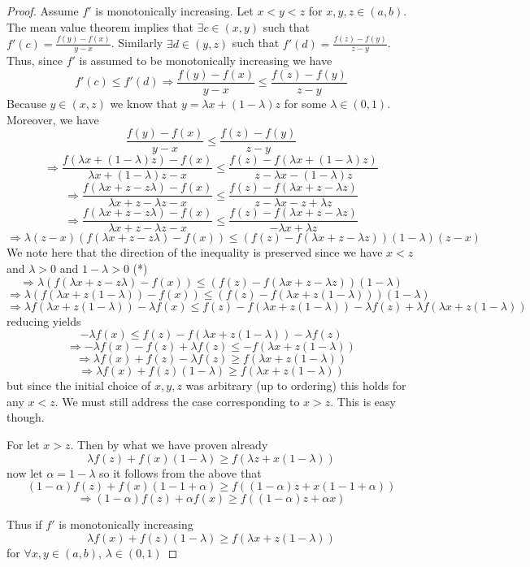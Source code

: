 \documentclass[12pt]{article}
\begin{document}
\begin{proof}Assume $f'$ is monotonically increasing. Let $x < y<z$ for $x,y,z \in (a,b)$. The mean value theorem implies that $\exists c \in (x,y)$ such that $f'(c)=\frac{f(y)-f(x)}{y-x}$. Similarly $\exists d \in (y,z)$ such that $f'(d)=\frac{f(z)-f(y)}{z-y}$. Thus, since $f'$ is assumed to be monotonically increasing we have 
\[f'(c) \leq f'(d) \Rightarrow \frac{f(y)-f(x)}{y-x} \leq \frac{f(z)-f(y)}{z-y}\]
Because $y\in(x,z)$ we know that $y=\lambda x+ (1-\lambda)z$ for some $\lambda \in (0,1)$. Moreover, we have
\[\frac{f(y)-f(x)}{y-x} \leq \frac{f(z)-f(y)}{z-y}\]
\[\Rightarrow \frac{f(\lambda x+ (1-\lambda)z)-f(x)}{\lambda x+ (1-\lambda)z-x} \leq \frac{f(z)-f(\lambda x+ (1-\lambda)z)}{z-\lambda x- (1-\lambda)z}\]
\[\Rightarrow \frac{f(\lambda x+ z - z \lambda)-f(x)}{\lambda x+ z-\lambda z-x} \leq \frac{f(z)-f(\lambda x+ z - \lambda z)}{z-\lambda x - z + \lambda z}\]
\[\Rightarrow \frac{f(\lambda x+ z - z \lambda)-f(x)}{\lambda x+ z-\lambda z-x} \leq \frac{f(z)-f(\lambda x+ z - \lambda z)}{-\lambda x  + \lambda z}\]
\[\Rightarrow  \lambda (z-x)  \left( f(\lambda x+ z - z \lambda)-f(x) \right) \leq \left( f(z)-f(\lambda x+ z - \lambda z)  \right) \left( 1 -\lambda \right) \left(  z - x  \right)\]
We note here that the direction of the inequality is preserved since we have $x<z$ and $\lambda > 0$ and $1-\lambda >0$ (*)
\[\Rightarrow  \lambda  \left( f(\lambda x+ z - z \lambda)-f(x) \right) \leq \left( f(z)-f(\lambda x+ z - \lambda z)  \right) \left( 1 -\lambda \right) \]
\[\Rightarrow  \lambda  \left( f(\lambda x+ z(1 -  \lambda))-f(x) \right) \leq \left( f(z)-f(\lambda x+ z(1  - \lambda ))  \right) \left( 1 -\lambda \right) \]
\[\Rightarrow  \lambda  f(\lambda x+ z(1 -  \lambda))- \lambda  f(x)  \leq f(z)-f(\lambda x+ z(1  - \lambda ))  -\lambda f(z)+ \lambda f(\lambda x+ z(1  - \lambda ))  \]
reducing yields
\[ - \lambda  f(x)  \leq f(z)-f(\lambda x+ z(1  - \lambda ))  -\lambda f(z)   \]
\[\Rightarrow - \lambda  f(x) -f(z) + \lambda f(z)   \leq -f(\lambda x+ z(1  - \lambda )) \]
\[\Rightarrow  \lambda  f(x) + f(z) - \lambda f(z)  \geq f(\lambda x+ z(1  - \lambda )) \]
\[\Rightarrow  \lambda  f(x) + f(z)(1 - \lambda )  \geq f(\lambda x+ z(1  - \lambda )) \]
but since the initial choice of $x, y, z$ was arbitrary (up to ordering) this holds for any $x<z$. We must still address the case corresponding to $x>z$. This is easy though.

For let $x>z$. Then by what we have proven already
\[ \lambda  f(z) + f(x)(1 - \lambda )  \geq f(\lambda z+ x(1  - \lambda )) \]
now let $\alpha = 1-\lambda$ so it follows from the above that
\[ ( 1-\alpha)  f(z) + f(x)(1 - 1+ \alpha )  \geq f((1-\alpha )z+ x(1  - 1+\alpha )) \]
\[ \Rightarrow ( 1-\alpha)  f(z) + \alpha f(x)  \geq f((1-\alpha )z+ \alpha x) \]

Thus if $f'$ is monotonically increasing
\[\lambda  f(x) + f(z)(1 - \lambda )  \geq f(\lambda x+ z(1  - \lambda )) \]
for $\forall x,y\in (a,b)$, $\lambda \in (0,1)$\end{proof}
\end{document}
